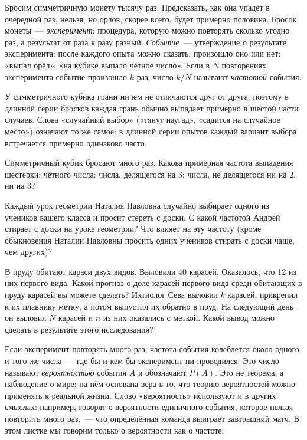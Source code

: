
\shapkaUstnoA


Бросим симметричную монету тысячу раз. Предсказать, как она упадёт в очередной раз, нельзя, но орлов, скорее всего, будет примерно половина. Бросок монеты~— \textit{эксперимент}: процедура, которую можно повторять сколько угодно раз, а результат от раза к разу разный. \textit{Событие}~— утверждение о результате эксперимента: после каждого опыта можно сказать, произошло оно или нет: «выпал орёл», «на кубике выпало чётное число». Если в $N$ повторениях эксперимента событие произошло $k$ раз, число $k/N$ называют \textit{частотой} события.

У симметричного кубика грани ничем не отличаются друг от друга, поэтому в длинной серии бросков каждая грань обычно выпадает примерно в шестой части случаев. Слова «случайный выбор» («тянут наугад», «садится на случайное место») означают то же самое: в длинной серии опытов каждый вариант выбора встречается примерно одинаково часто.

\zp Симметричный кубик бросают много раз. Какова примерная частота выпадения  шестёрки;  чётного числа;  числа, делящегося на 3;  числа, не делящегося ни на 2, ни на 3?

\zn Каждый урок геометрии Наталия Павловна случайно выбирает одного из учеников вашего класса и просит стереть с доски. С какой частотой  Андрей  стирает  с доски на  уроке геометрии?  Что  влияет на эту частоту (кроме обыкновения Наталии Павловны просить одних учеников стирать с доски чаще, чем других)?

\zn В пруду обитают караси двух видов. Выловили 40 карасей. Оказалось, что 12 из них первого вида. Какой прогноз о доле карасей первого вида среди обитающих в пруду карасей вы можете сделать?
 Ихтиолог Сева выловил $k$ карасей, прикрепил к их плавнику метку, а потом выпустил их обратно в пруд. На следующий день он выловил $N$  карасей и $n$ из них оказались с меткой. Какой вывод можно сделать в результате этого исследования?


\bigskip

Если эксперимент повторять много раз, частота события колеблется около одного и того же числа~— где бы и кем бы эксперимент ни проводился. Это число называют \textit{вероятностью} события $A$ и обозначают $P(A)$. Это не теорема, а наблюдение о мире; на нём основана вера в то, что теорию вероятностей можно применять к реальной жизни. Слово «вероятность» используют и в других смыслах: например, говорят о вероятности единичного события, которое нельзя повторить много раз,~— что определённая команда выиграет завтрашний матч. В этом листке мы говорим только о вероятности как о частоте.

